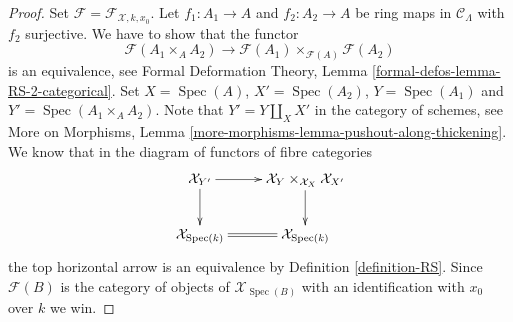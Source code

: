 \documentclass[10pt,a4paper]{amsart}
\theoremstyle{plain}
\theoremstyle{definition}
\theoremstyle{remark}
\numberwithin{equation}{subsection}
\def\Spec{\mathop{\mathrm{Spec}}}
\begin{document}
\begin{proof}
Set $\mathcal{F} = \mathcal{F}_{\mathcal{X}, k, x_0}$.
Let $f_1 : A_1 \to A$ and $f_2 : A_2 \to A$ be ring maps in
$\mathcal{C}_\Lambda$ with $f_2$ surjective. We have to show that
the functor
$$
\mathcal{F}(A_1 \times_A A_2)
\longrightarrow
\mathcal{F}(A_1) \times_{\mathcal{F}(A)} \mathcal{F}(A_2)
$$
is an equivalence, see
Formal Deformation Theory, Lemma \ref{formal-defos-lemma-RS-2-categorical}.
Set $X = \Spec(A)$, $X' = \Spec(A_2)$, $Y = \Spec(A_1)$ and
$Y' = \Spec(A_1 \times_A A_2)$. Note that $Y' = Y \amalg_X X'$ in the
category of schemes, see
More on Morphisms, Lemma \ref{more-morphisms-lemma-pushout-along-thickening}.
We know that in the diagram of functors of fibre categories
$$
\xymatrix{
\mathcal{X}_{Y'} \ar[r] \ar[d] &
\mathcal{X}_Y \times_{\mathcal{X}_X} \mathcal{X}_{X'} \ar[d] \\
\mathcal{X}_{\Spec(k)} \ar@{=}[r] & \mathcal{X}_{\Spec(k)}
}
$$
the top horizontal arrow is an equivalence by
Definition \ref{definition-RS}.
Since $\mathcal{F}(B)$ is the category of objects of $\mathcal{X}_{\Spec(B)}$
with an identification with $x_0$ over $k$ we win.
\end{proof}
\end{document}
